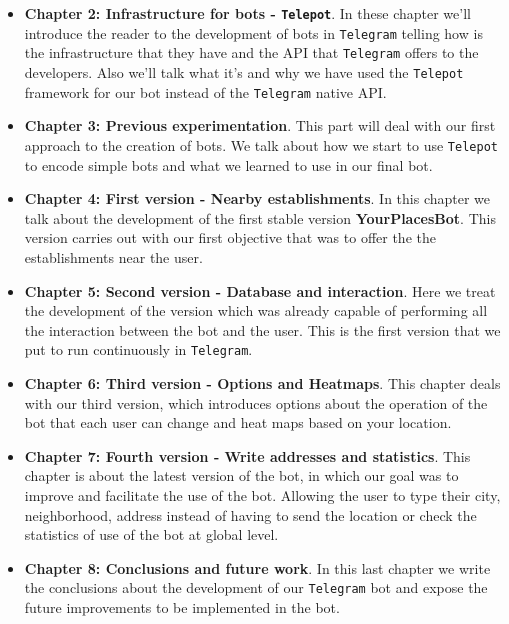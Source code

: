 \documentclass[oneside]{memoir}
\begin{document}
\begin{itemize}
  \item \textbf{Chapter 2: Infrastructure for bots - \texttt{Telepot}}. In these chapter we'll introduce the reader to the development of bots in \texttt{Telegram} telling how is the infrastructure that they have and the API that \texttt{Telegram} offers to the developers. Also we'll talk what it's and why we have used the \texttt{Telepot} framework for our bot instead of the \texttt{Telegram} native API.
	
  \item \textbf{Chapter 3: Previous experimentation}. This part will deal with our first approach to the creation of bots. We talk about how we start to use \texttt{Telepot} to encode simple bots and what we learned to use in our final bot.
	
  \item \textbf{Chapter 4: First version - Nearby establishments}. In this chapter we talk about the development of the first stable version \textbf{YourPlacesBot}. This version carries out with our first objective that was to offer the the establishments near the user. 
  
  \item \textbf{Chapter 5: Second version - Database and interaction}. Here we treat the development of the version which was already capable of performing all the interaction between the bot and the user. This is the first version that we put to run continuously in \texttt{Telegram}.
  
  \item \textbf{Chapter 6: Third version - Options and Heatmaps}. This chapter deals with our third version, which introduces options about the operation of the bot that each user can change and heat maps based on your location. 
	
  \item \textbf{Chapter 7: Fourth version - Write addresses and statistics}. This chapter is about the latest version of the bot, in which our goal was to improve and facilitate the use of the bot. Allowing the user to type their city, neighborhood, address instead of having to send the location or check the statistics of use of the bot at global level.
  
  \item \textbf{Chapter 8: Conclusions and future work}. In this last chapter we write the conclusions about the development of our \texttt{Telegram} bot and expose the future improvements to be implemented in the bot.
\end{itemize}
\end{document}
